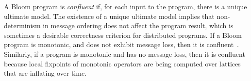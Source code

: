 A Bloom program is {\em confluent} if, for each input to the program, there is a
unique ultimate model.  The existence of a unique ultimate model implies that
non-determinism in message ordering does not affect the program result, which is
sometimes a desirable correctness criterion for distributed programs.  If a
Bloom program is monotonic, and does not exhibit message loss, then it is
confluent~\cite{dedalus-pods12-tr}.  Similarly, if a \lang program is monotonic
and has no message loss, then it is confluent because local fixpoints of
monotonic operators are being computed over lattices that are inflating over
time.
